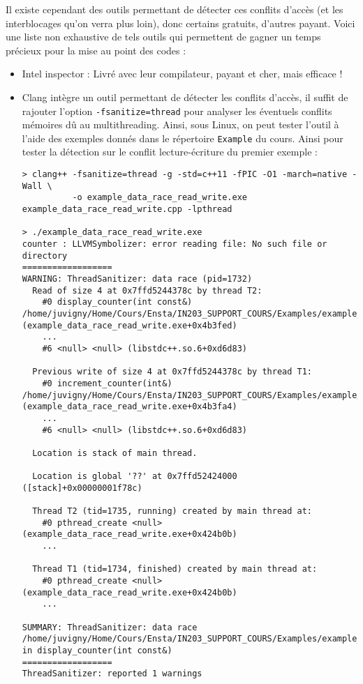 \documentclass[fleqn,11pt]{article}
\begin{document}
Il existe cependant des outils permettant de détecter ces conflits d'accès (et les interblocages qu'on verra plus loin), donc certains gratuits, d'autres payant. Voici une liste non exhaustive de tels outils
qui permettent de gagner un temps précieux pour la mise au point des codes :
\begin{itemize}
  \item Intel inspector : Livré avec leur compilateur, payant et cher, mais efficace !
  \item Clang intègre un outil permettant de détecter les conflits d'accès, il suffit de rajouter l'option
  \texttt{-fsanitize=thread} pour analyser les éventuels conflits mémoires dû au multithreading. Ainsi, sous Linux, on peut tester l'outil à l'aide des exemples donnés dans le répertoire \texttt{Example} du cours.
  Ainsi pour tester la détection sur le conflit lecture-écriture du premier exemple :
  \begin{verbatim}
> clang++ -fsanitize=thread -g -std=c++11 -fPIC -O1 -march=native -Wall \
          -o example_data_race_read_write.exe example_data_race_read_write.cpp -lpthread

> ./example_data_race_read_write.exe
counter : LLVMSymbolizer: error reading file: No such file or directory
==================
WARNING: ThreadSanitizer: data race (pid=1732)
  Read of size 4 at 0x7ffd5244378c by thread T2:
    #0 display_counter(int const&) /home/juvigny/Home/Cours/Ensta/IN203_SUPPORT_COURS/Examples/example_data_race_read_write.cpp:16:38 (example_data_race_read_write.exe+0x4b3fed)
    ...
    #6 <null> <null> (libstdc++.so.6+0xd6d83)

  Previous write of size 4 at 0x7ffd5244378c by thread T1:
    #0 increment_counter(int&) /home/juvigny/Home/Cours/Ensta/IN203_SUPPORT_COURS/Examples/example_data_race_read_write.cpp:9:19 (example_data_race_read_write.exe+0x4b3fa4)
    ...
    #6 <null> <null> (libstdc++.so.6+0xd6d83)

  Location is stack of main thread.

  Location is global '??' at 0x7ffd52424000 ([stack]+0x00000001f78c)

  Thread T2 (tid=1735, running) created by main thread at:
    #0 pthread_create <null> (example_data_race_read_write.exe+0x424b0b)
    ...

  Thread T1 (tid=1734, finished) created by main thread at:
    #0 pthread_create <null> (example_data_race_read_write.exe+0x424b0b)
    ...

SUMMARY: ThreadSanitizer: data race /home/juvigny/Home/Cours/Ensta/IN203_SUPPORT_COURS/Examples/example_data_race_read_write.cpp:16:38 in display_counter(int const&)
==================
ThreadSanitizer: reported 1 warnings
  \end{verbatim}


\end{itemize}
\end{document}
